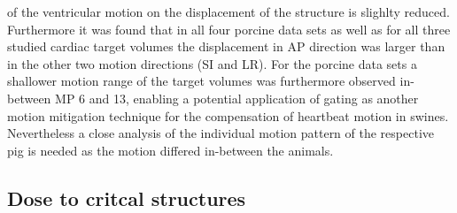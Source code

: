 \documentclass[type=dr, dr=rernat, accentcolor=tud7b,colorbacktitle, bigchapter, openright, twoside, 12pt ]{tudthesis}
\begin{document}
of the ventricular motion on the displacement of the structure is slighlty reduced. Furthermore it was found that in all four  
porcine data sets as well as for all three studied cardiac target volumes the displacement in AP direction was larger than in the other two 
motion directions (SI and LR). 
For the porcine data sets a shallower motion range of the target 
volumes was furthermore observed in-between MP 6 and 13, enabling a potential application of gating as another motion mitigation technique 
for the compensation of heartbeat motion in swines. Nevertheless a close analysis of the individual motion pattern of the respective pig 
is needed as the motion differed in-between the animals. 




\subsection{Dose to critcal structures}
\end{document}
